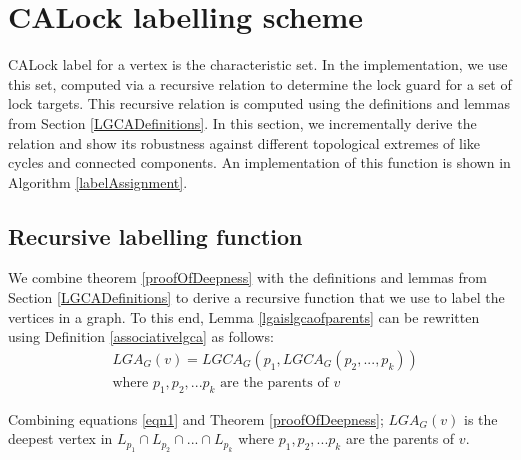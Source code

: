 \section{CALock labelling scheme} \label{sec:labellingScheme}
CALock label for a vertex is the characteristic set. 
In the implementation, we use this set, computed via a recursive relation to determine the lock guard for a set of lock targets. 
This recursive relation is computed using the definitions and lemmas from Section \ref{LGCADefinitions}. 
In this section, we incrementally derive the relation and show its robustness against different topological extremes of like cycles and connected components.  
An implementation of this function is shown in Algorithm \ref{labelAssignment}.


\subsection{Recursive labelling function} \label{sec:recursivelabellingfunction}
We combine theorem \ref{proofOfDeepness} with the definitions and lemmas from Section \ref{LGCADefinitions} to derive a recursive function that we use to label the vertices in a graph. To this end,
Lemma \ref{lgaislgcaofparents} can be rewritten using Definition \ref{associativelgca} as follows:
\begin{equation}\label{eqn1}
\begin{split}
    &{LGA_G(v) = LGCA_G (p_1, LGCA_G (p_2,...,p_k))}
    \\ &\text{where } p_1, p_2, ... p_k \text{ are the parents of } v
\end{split}
\end{equation}


Combining equations \ref{eqn1} and Theorem \ref{proofOfDeepness}; $LGA_G(v)$ is the deepest vertex in $ L_{p_1} \cap L_{p_2} \cap ... \cap L_{p_k}$ where $p_1, p_2, ... p_k$ are the parents of $v$.

